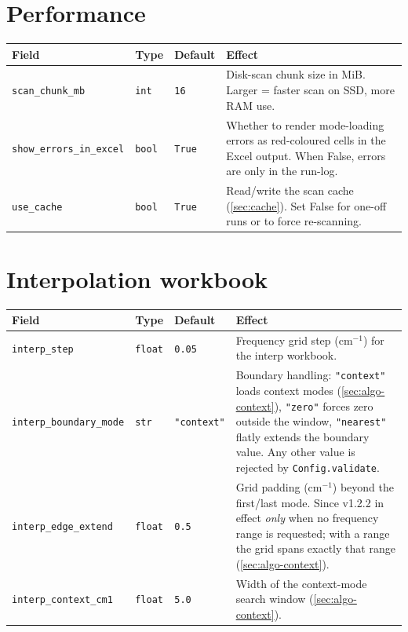 \documentclass[10pt,a4paper,twoside]{article}
\newcommand{\fn}[1]{\texttt{#1}}
\newcommand{\cfgkey}[1]{\texttt{#1}}
\begin{document}
\section{Performance}

\begin{longtable}{p{} p{} p{} p{}}
\toprule
\textbf{Field} & \textbf{Type} & \textbf{Default} & \textbf{Effect} \\
\midrule
\cfgkey{scan\_chunk\_mb} & \texttt{int} & \texttt{16}
  & Disk-scan chunk size in MiB. Larger = faster scan on SSD, more
    RAM use. \\
\cfgkey{show\_errors\_in\_excel} & \texttt{bool} & \texttt{True}
  & Whether to render mode-loading errors as red-coloured cells
    in the Excel output. When False, errors are only in the
    run-log. \\
\cfgkey{use\_cache} & \texttt{bool} & \texttt{True}
  & Read/write the scan cache (\cref{sec:cache}). Set False for
    one-off runs or to force re-scanning. \\
\bottomrule
\end{longtable}

\section{Interpolation workbook}

\begin{longtable}{p{} p{} p{} p{}}
\toprule
\textbf{Field} & \textbf{Type} & \textbf{Default} & \textbf{Effect} \\
\midrule
\cfgkey{interp\_step} & \texttt{float} & \texttt{0.05}
  & Frequency grid step (cm$^{-1}$) for the interp workbook. \\
\cfgkey{interp\_boundary\_mode} & \texttt{str} & \texttt{"context"}
  & Boundary handling: \texttt{"context"} loads context modes
    (\cref{sec:algo-context}), \texttt{"zero"} forces zero outside
    the window, \texttt{"nearest"} flatly extends the boundary
    value. Any other value is rejected by \fn{Config.validate}. \\
\cfgkey{interp\_edge\_extend} & \texttt{float} & \texttt{0.5}
  & Grid padding (cm$^{-1}$) beyond the first/last mode. Since
    v1.2.2 in effect \emph{only} when no frequency range is
    requested; with a range the grid spans exactly that range
    (\cref{sec:algo-context}). \\
\cfgkey{interp\_context\_cm1} & \texttt{float} & \texttt{5.0}
  & Width of the context-mode search window
    (\cref{sec:algo-context}). \\
\bottomrule
\end{longtable}
\end{document}
